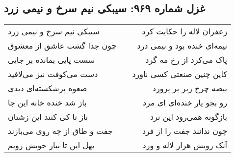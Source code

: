 \begin{center}
\section*{غزل شماره ۹۶۹: سیبکی نیم سرخ و نیمی زرد}
\label{sec:0969}
\begin{longtable}{l p{0.5cm} r}
سیبکی نیم سرخ و نیمی زرد
&&
زعفران لاله را حکایت کرد
\\
چون جدا گشت عاشق از معشوق
&&
نیمه‌ای خنده بود و نیمی درد
\\
سست پایی بمانده بر جایی
&&
پاک می‌کرد از رخ مه گرد
\\
دست می‌کوفت نیز می‌لافید
&&
کاین چنین صنعتی کسی ناورد
\\
صعوه پرشکسته‌ای دیدی
&&
بیضه چرخ زیر پر پرورد
\\
باز شد خنده خانه این جا
&&
رو بجو یار خنده‌ای ای مرد
\\
ناز تا کی کنند این زشتان
&&
بازگونه همی‌رود این نرد
\\
جفت و طاق از چه روی می‌بازند
&&
چون ندانند جفت را از فرد
\\
بهل این تا بیار خویش رویم
&&
آنک رویش هزار لاله و ورد
\\
\end{longtable}
\end{center}
